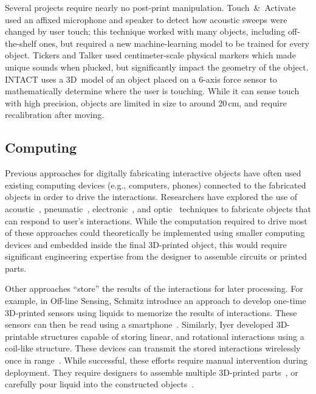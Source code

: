       Several projects require nearly no post-print manipulation.
      Touch~\&~Activate \cite{Ono:2013} used an affixed microphone and speaker
      to detect how acoustic sweeps were changed by user touch; this technique
      worked with many objects, including off-the-shelf ones, but required a new
      machine-learning model to be trained for every object.  Tickers and Talker
      \cite{Shi:2016} used centimeter-scale physical markers which made unique
      sounds when plucked, but significantly impact the geometry of the object.
      INTACT \cite{Hudin:2016} uses a 3D~model of an object placed on a 6-axis
      force sensor to mathematically determine where the user is touching. While
      it can sense touch with high precision, objects are limited in size to
      around 20\,cm, and require recalibration after moving.

    \subsection{Computing} \label{sec:computing}
      Previous approaches for digitally fabricating interactive objects
      have often used existing computing devices (e.g., computers,
      phones) connected to the fabricated objects in order to drive the
      interactions. Researchers have explored the use of
      acoustic~\cite{Savage:2015, Tejada:2018, Shi:2016},
      pneumatic~\cite{Tejada:2020, Vazquez:2015, Ou:2016},
      electronic~\cite{Schmitz:2019, Savage:2014,Schmitz:2015}, and
      optic~\cite{Willis:2012, Savage:2013} techniques to fabricate
      objects that can respond to user's interactions. While the
      computation required to drive most of these approaches could
      theoretically be implemented using smaller computing devices and
      embedded inside the final 3D-printed object, this would require
      significant engineering expertise from the designer to assemble
      circuits or printed parts.

      Other approaches ``store'' the results of the interactions for
      later processing. For example, in Off-line Sensing, Schmitz \etal
      introduce an approach to develop one-time 3D-printed sensors using
      liquids to memorize the results of interactions. These sensors can
      then be read using a smartphone~\cite{Schmitz:2018}. Similarly,
      Iyer \etal developed 3D-printable structures capable of storing
      linear, and rotational interactions using a coil-like structure.
      These devices can transmit the stored interactions wirelessly once
      in range~\cite{Iyer:2018}. While successful, these efforts require
      manual intervention during deployment. They require designers to
      assemble multiple 3D-printed parts~\cite{Iyer:2018}, or carefully
      pour liquid into the constructed objects~\cite{Schmitz:2018}.

